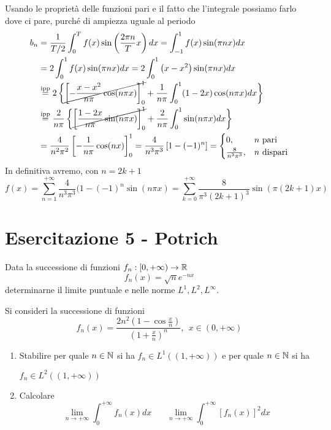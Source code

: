 Usando le proprietà delle funzioni pari e il fatto che l'integrale possiamo farlo dove ci pare, purché di ampiezza uguale al periodo
\begin{equation*}
\begin{aligned}
b_{n} & = \frac{1}{T/2}\int ^{T}_{0} f(x)\sin\left(\frac{2\pi n}{T} x\right) dx = \int ^{1}_{ - 1} f(x)\sin(\pi nx) dx\\
 & = 2\int ^{1}_{0} f(x)\sin(\pi nx) dx = 2\int ^{1}_{0}\left(x - x^{2}\right)\sin(\pi nx) dx\\
 & \overset{\text{ipp}}{ = } 2\left\{\cancel{\left[ - \frac{x - x^{2}}{n\pi }\cos(n\pi x)\right]^{1}_{0}} + \frac{1}{n\pi }\int ^{1}_{0}(1 - 2x)\cos(n\pi x) dx\right\}\\
 & \overset{\text{ipp}}{ = }\frac{2}{n\pi }\left\{\cancel{\left[\frac{1 - 2x}{n\pi }\sin(n\pi x)\right]^{1}_{0}} + \frac{2}{n\pi }\int ^{1}_{0}\sin(n\pi x) dx\right\}\\
 & = \frac{4}{n^{2} \pi ^{2}}\left[ - \frac{1}{n\pi }\cos (nx)\right]^{1}_{0} = \frac{4}{n^{3} \pi ^{3}}\left[ 1 - (- 1)^{n}\right] = \begin{cases}
0, & n\ \text{pari}\\
\frac{8}{n^{3} \pi ^{3}} , & n\ \text{dispari}
\end{cases}
\end{aligned}
\end{equation*}
In definitiva avremo, con $n = 2k + 1$
\begin{equation*}
f(x) = \sum ^{ + \infty }_{n = 1}\frac{4}{n^{3} \pi ^{3}} (1 - (- 1)^{n}\sin (n\pi x) = \sum ^{ + \infty }_{k = 0}\frac{8}{\pi ^{3} (2k + 1)^{3}}\sin (\pi (2k + 1)x)
\end{equation*}
\chapter{Esercitazione 5 - Potrich}
\ParteEsercizi
\Esercizio{}

Data la successione di funzioni $f_{n} :[ 0, + \infty)\rightarrow \mathbb{R} $
\begin{equation*}
f_{n}(x) = \sqrt{n} e^{ - nx}
\end{equation*}
determinarne il limite puntuale e nelle norme $L^{1} ,L^{2} ,L^{\infty }$.
\Esercizio{}

Si consideri la successione di funzioni
\begin{equation*}
f_{n} (x) = \frac{2n^{2}\left(1 - \cos\frac{x}{n}\right)}{\left(1 + \frac{x}{n}\right)^{n}} ,\ \ x\in (0, + \infty)
\end{equation*}
\begin{enumerate}
\item Stabilire per quale $n\in \mathbb{N} $ si ha $f_{n} \in L^{1}((1, + \infty))$ e per quale $n\in \mathbb{N} $ si ha 

$f_{n} \in L^{2}((1, + \infty))$
\item Calcolare\begin{equation*}
\lim\limits _{n\rightarrow + \infty }\int ^{ + \infty }_{0} f_{n}(x) dx\ \ \ \ \ \ \ \ \lim\limits _{n\rightarrow + \infty }\int ^{ + \infty }_{0}[ f_{n}(x)]^{2} dx
\end{equation*}
\end{enumerate}
\Esercizio{}


